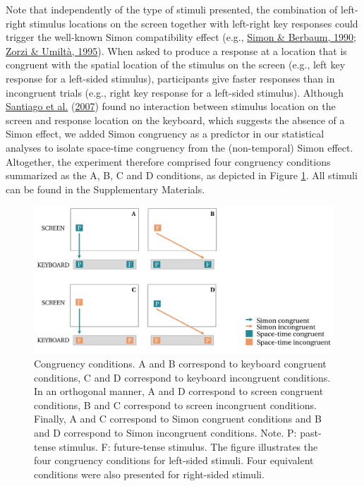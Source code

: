 \documentclass[
  a4paper,12pt,twoside,onecolumn,openright,final,oldfontcommands]{memoir}
\begin{document}
Note that independently of the type of stimuli presented, the combination of left-right stimulus locations on the screen together with left-right key responses could trigger the well-known Simon compatibility effect (e.g., \protect\hyperlink{ref-simon_effect_1990}{Simon \& Berbaum, 1990}; \protect\hyperlink{ref-zorzi_computational_1995}{Zorzi \& Umiltà, 1995}). When asked to produce a response at a location that is congruent with the spatial location of the stimulus on the screen (e.g., left key response for a left-sided stimulus), participants give faster responses than in incongruent trials (e.g., right key response for a left-sided stimulus). Although \protect\hyperlink{ref-santiago_time_2007}{Santiago et al.} (\protect\hyperlink{ref-santiago_time_2007}{2007}) found no interaction between stimulus location on the screen and response location on the keyboard, which suggests the absence of a Simon effect, we added Simon congruency as a predictor in our statistical analyses to isolate space-time congruency from the (non-temporal) Simon effect. Altogether, the experiment therefore comprised four congruency conditions summarized as the A, B, C and D conditions, as depicted in Figure \ref{fig:chap-5-fig2}. All stimuli can be found in the Supplementary Materials.

\begin{figure}[htbp!]

{\centering \includegraphics[width=1\linewidth]{figures/chap-5-fig2} 

}

\caption{Congruency conditions. A and B correspond to keyboard congruent conditions, C and D correspond to keyboard incongruent conditions.  In an orthogonal manner, A and D correspond to screen congruent conditions, B and C correspond to screen incongruent conditions. Finally, A and C correspond to Simon congruent conditions and B and D correspond to Simon incongruent conditions. Note. P: past-tense stimulus. F: future-tense stimulus.  The figure illustrates the four congruency conditions for left-sided stimuli.  Four equivalent conditions were also presented for right-sided stimuli.}\label{fig:chap-5-fig2}
\end{figure}
\end{document}
